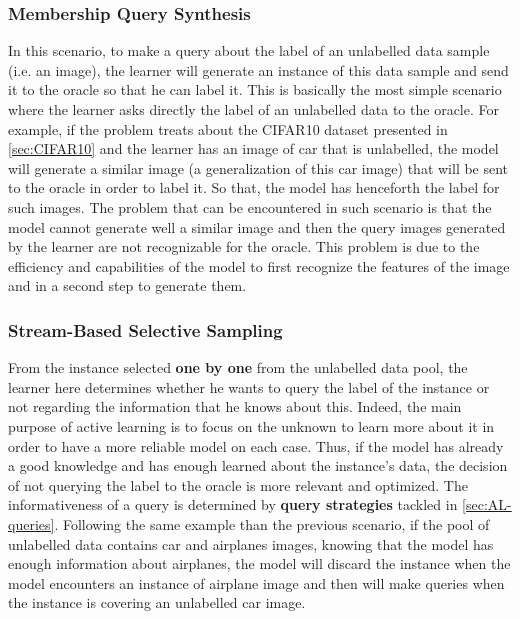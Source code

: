 \documentclass[11pt, openany]{report}
\theoremstyle{plain}
\theoremstyle{definition}
\theoremstyle{remark}
\begin{document}
\subsubsection{Membership Query Synthesis}
In this scenario, to make a query about the label of an unlabelled data sample (i.e. an image), the learner will generate an instance of this data sample and send it to the oracle so that he can label it. This is basically the most simple scenario where the learner asks directly the label of an unlabelled data to the oracle. For example, if the problem treats about the CIFAR10 dataset presented in \autoref{sec:CIFAR10} and the learner has an image of car that is unlabelled, the model will generate a similar image (a generalization of this car image) that will be sent to the oracle in order to label it. So that, the model has henceforth the label for such images. The problem that can be encountered in such scenario is that the model cannot generate well a similar image and then the query images generated by the learner are not recognizable for the oracle. This problem is due to the efficiency and capabilities of the model to first recognize the features of the image and in a second step to generate them.   


\subsubsection{Stream-Based Selective Sampling}
From the instance selected \textbf{one by one} from the unlabelled data pool, the learner here determines whether he wants to query the label of the instance or not regarding the information that he knows about this. Indeed, the main purpose of active learning is to focus on the unknown to learn more about it in order to have a more reliable model on each case. Thus, if the model has already a good knowledge and has enough learned about the instance's data, the decision of not querying the label to the oracle is more relevant and optimized. The informativeness of a query is determined by \textbf{query strategies} tackled in \autoref{sec:AL-queries}. Following the same example than the previous scenario, if the pool of unlabelled data contains car and airplanes images, knowing that the model has enough information about airplanes, the model will discard the instance when the model encounters an instance of airplane image and then will make queries when the instance is covering an unlabelled car image.    
\end{document}
